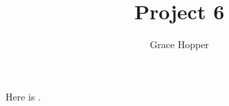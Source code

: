 \documentclass{article}
\title{Project 6}
\author{Grace Hopper}
\begin{document}
\maketitle



Here is \extra{}.


\end{document}
